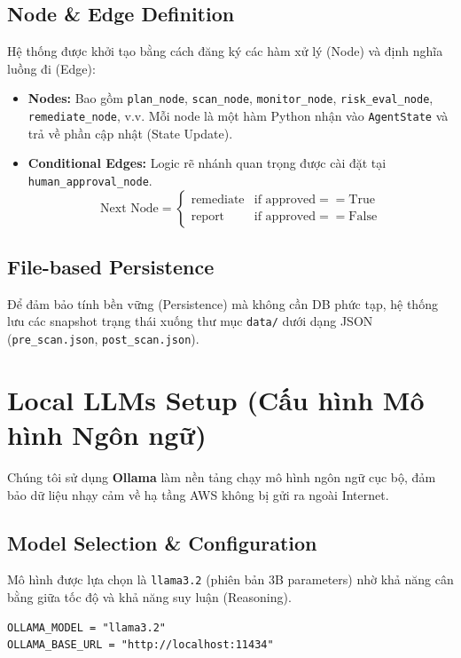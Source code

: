 \subsection{Node \& Edge Definition}

Hệ thống được khởi tạo bằng cách đăng ký các hàm xử lý (Node) và định nghĩa luồng đi (Edge):

\begin{itemize}
    \item \textbf{Nodes:} Bao gồm \texttt{plan\_node}, \texttt{scan\_node}, \texttt{monitor\_node}, \texttt{risk\_eval\_node}, \texttt{remediate\_node}, v.v. Mỗi node là một hàm Python nhận vào \texttt{AgentState} và trả về phần cập nhật (State Update).
    \item \textbf{Conditional Edges:} Logic rẽ nhánh quan trọng được cài đặt tại \texttt{human\_approval\_node}.
    \[
    \text{Next Node} = \begin{cases} 
    \text{remediate} & \text{if } \text{approved} == \text{True} \\
    \text{report} & \text{if } \text{approved} == \text{False}
    \end{cases}
    \]
\end{itemize}

\subsection{File-based Persistence}
Để đảm bảo tính bền vững (Persistence) mà không cần DB phức tạp, hệ thống lưu các snapshot trạng thái xuống thư mục \texttt{data/} dưới dạng JSON (\texttt{pre\_scan.json}, \texttt{post\_scan.json}).

\section{Local LLMs Setup (Cấu hình Mô hình Ngôn ngữ)}

Chúng tôi sử dụng \textbf{Ollama} làm nền tảng chạy mô hình ngôn ngữ cục bộ, đảm bảo dữ liệu nhạy cảm về hạ tầng AWS không bị gửi ra ngoài Internet.

\subsection{Model Selection & Configuration}
Mô hình được lựa chọn là \texttt{llama3.2} (phiên bản 3B parameters) nhờ khả năng cân bằng giữa tốc độ và khả năng suy luận (Reasoning).

\begin{verbatim}
OLLAMA_MODEL = "llama3.2"
OLLAMA_BASE_URL = "http://localhost:11434"
\end{verbatim}

